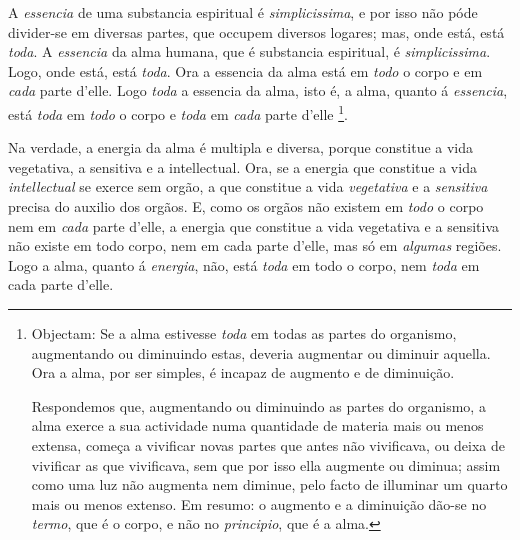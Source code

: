 A \emph{essencia} de uma substancia espiritual é \emph{simplicissima}, e por isso não póde divider-se em diversas partes, que occupem diversos logares; mas, onde está, está \emph{toda}. A \emph{essencia} da alma humana, que é substancia espiritual, é \emph{simplicissima}. Logo, onde está, está \emph{toda}. Ora a essencia da alma está em \emph{todo} o corpo e em \emph{cada} parte d'elle. Logo \emph{toda} a essencia da alma, isto é, a alma, quanto á \emph{essencia}, está \emph{toda} em \emph{todo} o corpo e \emph{toda} em \emph{cada} parte d'elle \footnote{Objectam: Se a alma estivesse \emph{toda} em todas as partes do organismo, augmentando ou diminuindo estas, deveria augmentar ou diminuir aquella. Ora a alma, por ser simples, é incapaz de augmento e de diminuição.\par Respondemos que, augmentando ou diminuindo as partes do organismo, a alma exerce a sua actividade numa quantidade de materia mais ou menos extensa, começa a vivificar novas partes que antes não vivificava, ou deixa de vivificar as que vivificava, sem que por isso ella augmente ou diminua; assim como uma luz não augmenta nem diminue, pelo facto de illuminar um quarto mais ou menos extenso. Em resumo: o augmento e a diminuição dão-se no \emph{termo}, que é o corpo, e não no \emph{principio}, que é a alma.}.


Na verdade, a energia da alma é multipla e diversa, porque constitue a vida vegetativa, a sensitiva e a intellectual. Ora, se a energia que constitue a vida \emph{intellectual} se exerce sem orgão, a que constitue a vida \emph{vegetativa} e a \emph{sensitiva} precisa do auxilio dos orgãos. E, como os orgãos não existem em \emph{todo} o corpo nem em \emph{cada} parte d'elle, a energia que constitue a vida vegetativa e a   sensitiva não existe em todo corpo, nem em cada parte d'elle, mas só em \emph{algumas} regiões. Logo a alma, quanto á \emph{energia}, não, está \emph{toda} em todo o corpo, nem \emph{toda} em cada parte d'elle.

